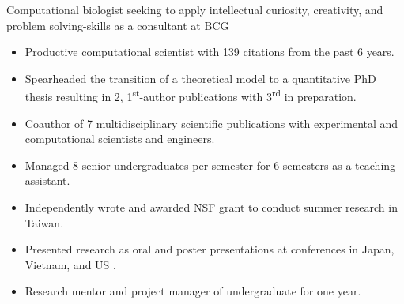 

\begin{cventries}
\vspace{-4.0mm}

  \cventry
    {} %
    {} %
    {} %
    {} %
    {
      \begin{cvitems} %
        \item {Computational biologist seeking to apply intellectual curiosity, creativity, and problem solving-skills as a consultant at BCG}
        \begin{itemize}
        	\item Productive computational scientist with 139 citations from the past 6 years.
        	\item Spearheaded the transition of a theoretical model to a quantitative PhD thesis resulting in 2, 1\textsuperscript{st}-author publications with 3\textsuperscript{rd} in preparation.
        	\item Coauthor of 7 multidisciplinary scientific publications with experimental and computational scientists and engineers.
        	\item Managed 8 senior undergraduates per semester for 6 semesters as a teaching assistant.
        	\item Independently wrote and awarded NSF grant to conduct summer research in Taiwan.
       	 	\item Presented research as oral and poster presentations at conferences in Japan, Vietnam, and US  .
         	\item Research mentor and project manager of undergraduate for one year.
        \end{itemize}
      \end{cvitems}
    }
\vspace{-4.0mm}
\end{cventries}

